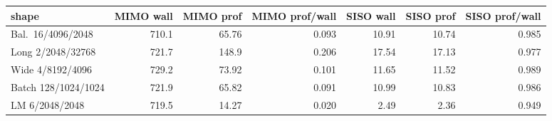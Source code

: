 \begin{tabular}{l r r r r r r}
\toprule
shape & MIMO wall & MIMO prof & MIMO prof/wall & SISO wall & SISO prof & SISO prof/wall \\
\midrule
Bal.\ 16/4096/2048 & 710.1 & 65.76 & 0.093 & 10.91 & 10.74 & 0.985 \\
Long 2/2048/32768 & 721.7 & 148.9 & 0.206 & 17.54 & 17.13 & 0.977 \\
Wide 4/8192/4096 & 729.2 & 73.92 & 0.101 & 11.65 & 11.52 & 0.989 \\
Batch 128/1024/1024 & 721.9 & 65.82 & 0.091 & 10.99 & 10.83 & 0.986 \\
LM 6/2048/2048 & 719.5 & 14.27 & 0.020 & 2.49 & 2.36 & 0.949 \\
\bottomrule
\end{tabular}
